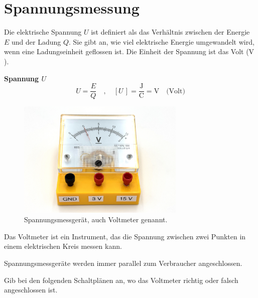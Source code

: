 
\section{Spannungsmessung}

Die elektrische Spannung $U$ ist definiert als das Verhältnis zwischen der Energie $E$ und der Ladung $Q$.
Sie gibt an, wie viel elektrische Energie umgewandelt wird, wenn eine Ladungseinheit geflossen ist.
Die Einheit der Spannung ist das Volt ($\unit{\volt}$).

\begin{greenbox}
\textbf{Spannung $U$}
$$
    U = \frac{E}{Q} \quad,\quad \left[ U \, \right] = \frac{\unit{\joule}}{\unit{\coulomb}} = \unit{\volt} \quad \text{(Volt)}
$$
\end{greenbox}

\begin{figure}[h!]
    \centering
    \includegraphics[width=8cm]{_images/volt_meter}
    \caption{Spannungsmessgerät, auch Voltmeter genannt.}
    \label{fig:voltmeter}
\end{figure}

Das Voltmeter ist ein Instrument, das die Spannung zwischen zwei Punkten in einem
elektrischen Kreis messen kann.

\begin{greenbox}
Spannungsmessgeräte werden immer parallel zum Verbraucher angeschlossen.
\end{greenbox}





Gib bei den folgenden Schaltplänen an, wo das Voltmeter richtig oder falsch angeschlossen ist.

